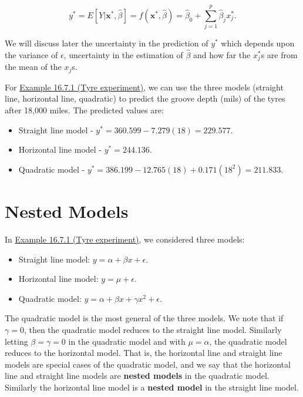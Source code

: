 \documentclass[
]{book}
\providecommand{\tightlist}{%
  \setlength{\itemsep}{0pt}\setlength{\parskip}{0pt}}
\begin{document}
\[ y^\ast = E[Y | \mathbf{x}^\ast, \hat{\beta}]= f(\mathbf{x}^\ast, \hat{\beta}) = \hat{\beta}_0 + \sum_{j=1}^p \hat{\beta}_j x_j^\ast. \]

We will discuss later the uncertainty in the prediction of \(y^\ast\) which depends upon the variance of \(\epsilon\), uncertainty in the estimation of \(\hat{\beta}\) and how far the \(x_j^\ast\)s are from the mean of the \(x_j\)s.

For \protect\hyperlink{Sec_LinearI:ex:example_mileage}{Example 16.7.1 (Tyre experiment)}, we can use the three models (straight line, horizontal line, quadratic) to predict the groove depth (mils) of the tyres after 18,000 miles. The predicted values are:

\begin{itemize}
\tightlist
\item
  Straight line model - \(y^\ast = 360.599 -7.279 (18) = 229.577\).\\
\item
  Horizontal line model - \(y^\ast = 244.136\).\\
\item
  Quadratic model - \(y^\ast = 386.199 -12.765 (18) + 0.171 (18^2) = 211.833\).
\end{itemize}

\hypertarget{Sec_LinearI:Nested}{%
\section{Nested Models}\label{Sec_LinearI:Nested}}

In \protect\hyperlink{Sec_LinearI:ex:example_mileage}{Example 16.7.1 (Tyre experiment)}, we considered three models:

\begin{itemize}
\tightlist
\item
  Straight line model: \(y = \alpha + \beta x + \epsilon\).\\
\item
  Horizontal line model: \(y = \mu + \epsilon\).\\
\item
  Quadratic model: \(y = \alpha + \beta x + \gamma x^2+ \epsilon\).
\end{itemize}

The quadratic model is the most general of the three models. We note that if \(\gamma =0\), then the quadratic model reduces to the straight line model. Similarly letting \(\beta= \gamma =0\) in the quadratic model and with \(\mu = \alpha\), the quadratic model reduces to the horizontal model. That is, the horizontal line and straight line models are special cases of the quadratic model, and we say that the horizontal line and straight line models are \textbf{nested models} in the quadratic model. Similarly the horizontal line model is a \textbf{nested model} in the straight line model.
\end{document}
